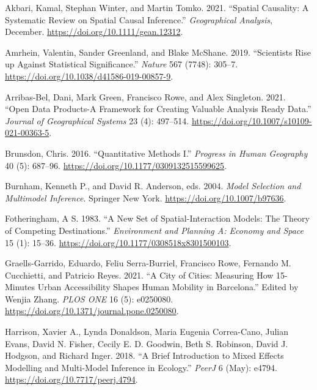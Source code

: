 \documentclass[11pt,letterpaper]{article}
\newlength{\cslhangindent}
\newlength{\cslentryspacingunit} %
\newenvironment{CSLReferences}[2] %
 {%
  \setlength{\parindent}{0pt}
  \ifodd #1
  \let\oldpar\par
  \def\par{\hangindent=\cslhangindent\oldpar}
  \fi
  \setlength{\parskip}{#2\cslentryspacingunit}
 }%
 {}
\begin{document}
\hypertarget{refs}{}
\begin{CSLReferences}{1}{0}
\leavevmode{}%
Akbari, Kamal, Stephan Winter, and Martin Tomko. 2021. {``Spatial Causality: A Systematic Review on Spatial Causal Inference.''} \emph{Geographical Analysis}, December. \url{https://doi.org/10.1111/gean.12312}.

\leavevmode{}%
Amrhein, Valentin, Sander Greenland, and Blake McShane. 2019. {``Scientists Rise up Against Statistical Significance.''} \emph{Nature} 567 (7748): 305--7. \url{https://doi.org/10.1038/d41586-019-00857-9}.

\leavevmode{}%
Arribas-Bel, Dani, Mark Green, Francisco Rowe, and Alex Singleton. 2021. {``Open Data Products-A Framework for Creating Valuable Analysis Ready Data.''} \emph{Journal of Geographical Systems} 23 (4): 497--514. \url{https://doi.org/10.1007/s10109-021-00363-5}.

\leavevmode{}%
Brunsdon, Chris. 2016. {``Quantitative Methods I.''} \emph{Progress in Human Geography} 40 (5): 687--96. \url{https://doi.org/10.1177/0309132515599625}.

\leavevmode{}%
Burnham, Kenneth P., and David R. Anderson, eds. 2004. \emph{Model Selection and Multimodel Inference}. Springer New York. \url{https://doi.org/10.1007/b97636}.

\leavevmode{}%
Fotheringham, A S. 1983. {``A New Set of Spatial-Interaction Models: The Theory of Competing Destinations.''} \emph{Environment and Planning A: Economy and Space} 15 (1): 15--36. \url{https://doi.org/10.1177/0308518x8301500103}.

\leavevmode{}%
Graells-Garrido, Eduardo, Feliu Serra-Burriel, Francisco Rowe, Fernando M. Cucchietti, and Patricio Reyes. 2021. {``A City of Cities: Measuring How 15-Minutes Urban Accessibility Shapes Human Mobility in Barcelona.''} Edited by Wenjia Zhang. \emph{PLOS ONE} 16 (5): e0250080. \url{https://doi.org/10.1371/journal.pone.0250080}.

\leavevmode{}%
Harrison, Xavier A., Lynda Donaldson, Maria Eugenia Correa-Cano, Julian Evans, David N. Fisher, Cecily E. D. Goodwin, Beth S. Robinson, David J. Hodgson, and Richard Inger. 2018. {``A Brief Introduction to Mixed Effects Modelling and Multi-Model Inference in Ecology.''} \emph{PeerJ} 6 (May): e4794. \url{https://doi.org/10.7717/peerj.4794}.


\end{CSLReferences}
\end{document}
